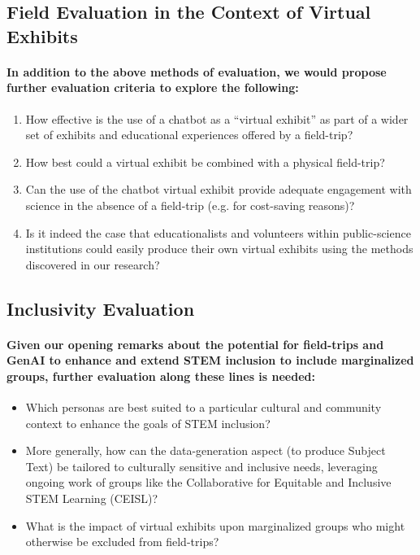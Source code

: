\documentclass{article}
\begin{document}
\subsection*{Field Evaluation in the Context of Virtual Exhibits}

\paragraph{In addition to the above methods of evaluation, we would propose further evaluation criteria to explore the following:}

\begin{enumerate}
    \item How effective is the use of a chatbot as a “virtual exhibit” as part of a wider set of exhibits and educational experiences offered by a field-trip?
    \item How best could a virtual exhibit be combined with a physical field-trip?
    \item Can the use of the chatbot virtual exhibit provide adequate engagement with science in the absence of a field-trip (e.g. for cost-saving reasons)?
    \item Is it indeed the case that educationalists and volunteers within public-science institutions could easily produce their own virtual exhibits using the methods discovered in our research?
\end{enumerate}

\subsection*{Inclusivity Evaluation}

\paragraph{Given our opening remarks about the potential for field-trips and GenAI to enhance and extend STEM inclusion to include marginalized groups, further evaluation along these lines is needed:}

\begin{itemize}
    \item Which personas are best suited to a particular cultural and community context to enhance the goals of STEM inclusion?
    \item More generally, how can the data-generation aspect (to produce Subject Text) be tailored to culturally sensitive and inclusive needs, leveraging ongoing work of groups like the Collaborative for Equitable and Inclusive STEM Learning (CEISL)?
    \item What is the impact of virtual exhibits upon marginalized groups who might otherwise be excluded from field-trips?
\end{itemize}
\end{document}
